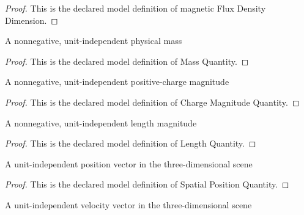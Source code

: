\begin{proof}
  This is the declared model definition of magnetic Flux Density Dimension.
\end{proof}
\begin{definition}
  \label{def:physics:phyx-mini-0958:phyxminiproblems-problemphyxmini0958-massquantity}
  A nonnegative, unit-independent physical mass
\end{definition}
\begin{proof}
  This is the declared model definition of Mass Quantity.
\end{proof}
\begin{definition}
  \label{def:physics:phyx-mini-0958:phyxminiproblems-problemphyxmini0958-chargemagnitudequantity}
  A nonnegative, unit-independent positive-charge magnitude
\end{definition}
\begin{proof}
  This is the declared model definition of Charge Magnitude Quantity.
\end{proof}
\begin{definition}
  \label{def:physics:phyx-mini-0958:phyxminiproblems-problemphyxmini0958-lengthquantity}
  A nonnegative, unit-independent length magnitude
\end{definition}
\begin{proof}
  This is the declared model definition of Length Quantity.
\end{proof}
\begin{definition}
  \label{def:physics:phyx-mini-0958:phyxminiproblems-problemphyxmini0958-spatialpositionquantity}
  A unit-independent position vector in the three-dimensional scene
\end{definition}
\begin{proof}
  This is the declared model definition of Spatial Position Quantity.
\end{proof}
\begin{definition}
  \label{def:physics:phyx-mini-0958:phyxminiproblems-problemphyxmini0958-spatialvelocityquantity}
  A unit-independent velocity vector in the three-dimensional scene
\end{definition}
